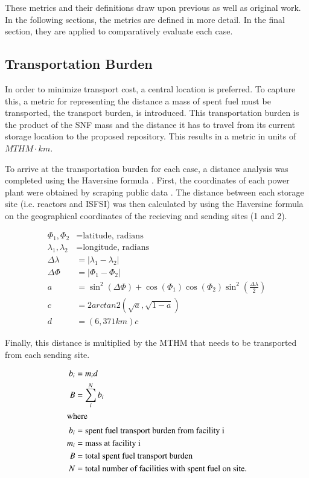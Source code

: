 These metrics and their definitions draw upon previous 
\cite{freeze_siting_2015,waleed_regional_2015} as well as original work.  In the 
following sections, the metrics are defined in more detail. In 
the final section, they are applied to comparatively evaluate each 
case.

\subsection{Transportation Burden}
 In order to minimize transport cost, a central location is preferred. To 
 capture this, a metric 
 for representing the distance a mass of spent fuel must be transported, the 
 transport burden, is introduced. This transportation burden is the product 
 of the \gls{SNF} mass and the distance it has to travel from its current 
 storage location to the proposed repository. This results in a 
 metric in units of $MTHM\cdot km$. 

 To arrive at the transportation burden for each case, a distance analysis was 
 completed using the Haversine formula \cite{shumaker_astronomical_1984}. 
 First, the coordinates of each power plant were obtained by scraping public 
 data \cite{wikipedia}.  The distance between each storage site (i.e. reactors 
 and \gls{ISFSI}) was then calculated by using the Haversine formula on the 
 geographical coordinates of the recieving and sending sites (1 and 2). 

 \begin{align} 
         \Phi_1,\Phi_2&= \mbox{latitude, radians}\\
         \lambda_1,\lambda_2 &= \mbox{longitude, radians}\\
         \Delta\lambda &= \left|\lambda_1 - \lambda_2\right|\\
         \Delta\Phi &= \left|\Phi_1 - \Phi_2\right|\\
         a&=\sin^2(\Delta\Phi)+\cos(\Phi_1)\cos(\Phi_2)\sin^2{\left(\frac{\Delta\lambda}{2}\right)}\\
         c &= 2arctan2(\sqrt{a},\sqrt{1-a})\\
         d &=  (6,371km)c
 \end{align}


Finally, this distance is multiplied by the \gls{MTHM} that needs to be 
transported from each sending site.

\begin{align}
        b_i &= m_id\\
        B &= \sum_i^N b_i\\
        \intertext{where}
        b_i &= \mbox{spent fuel transport burden from facility i}\\
        m_i &= \mbox{mass at facility i}\\
        B &= \mbox{total spent fuel transport burden}\\
        N &= \mbox{total number of facilities with spent fuel on site.}
\end{align}

